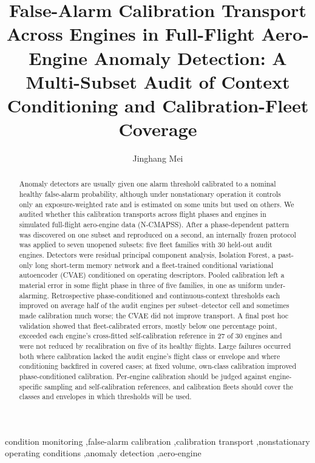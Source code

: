 \documentclass[preprint,11pt,a4paper]{elsarticle}
\begin{document}
\begin{frontmatter}
\title{False-Alarm Calibration Transport Across Engines in Full-Flight Aero-Engine Anomaly Detection: A Multi-Subset Audit of Context Conditioning and Calibration-Fleet Coverage}
\author[usyd]{Jinghang Mei}
\address[usyd]{School of Electrical and Computer Engineering, The University of Sydney, Sydney, Australia}
\begin{abstract}
Anomaly detectors are usually given one alarm threshold calibrated to a nominal healthy false-alarm probability, although under nonstationary operation it controls only an exposure-weighted rate and is estimated on some units but used on others. We audited whether this calibration transports across flight phases and engines in simulated full-flight aero-engine data (N-CMAPSS). After a phase-dependent pattern was discovered on one subset and reproduced on a second, an internally frozen protocol was applied to seven unopened subsets: five fleet families with 30 held-out audit engines. Detectors were residual principal component analysis, Isolation Forest, a past-only long short-term memory network and a fleet-trained conditional variational autoencoder (CVAE) conditioned on operating descriptors. Pooled calibration left a material error in some flight phase in three of five families, in one as uniform under-alarming. Retrospective phase-conditioned and continuous-context thresholds each improved on average half of the audit engines per subset–detector cell and sometimes made calibration much worse; the CVAE did not improve transport. A final post hoc validation showed that fleet-calibrated errors, mostly below one percentage point, exceeded each engine's cross-fitted self-calibration reference in 27 of 30 engines and were not reduced by recalibration on five of its healthy flights. Large failures occurred both where calibration lacked the audit engine's flight class or envelope and where conditioning backfired in covered cases; at fixed volume, own-class calibration improved phase-conditioned calibration. Per-engine calibration should be judged against engine-specific sampling and self-calibration references, and calibration fleets should cover the classes and envelopes in which thresholds will be used.
\end{abstract}
\begin{keyword}
condition monitoring \sep false-alarm calibration \sep calibration transport \sep nonstationary operating conditions \sep anomaly detection \sep aero-engine
\end{keyword}
\end{frontmatter}
\linenumbers
\end{document}
